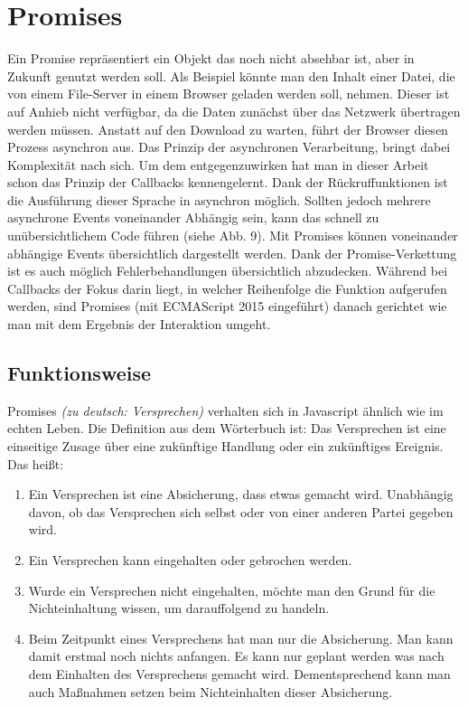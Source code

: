 \section{Promises}

Ein Promise repräsentiert ein Objekt das noch nicht absehbar ist, aber in Zukunft genutzt werden soll. Als Beispiel könnte man den Inhalt einer Datei, die von einem File-Server in einem Browser geladen werden soll, nehmen. Dieser ist auf Anhieb nicht verfügbar, da die Daten zunächst über das Netzwerk übertragen werden müssen. Anstatt auf den Download zu warten, führt der Browser diesen Prozess asynchron aus. Das Prinzip der asynchronen Verarbeitung, bringt dabei Komplexität nach sich. Um dem entgegenzuwirken hat man in dieser Arbeit schon das Prinzip der Callbacks kennengelernt. Dank der Rückruffunktionen ist die Ausführung dieser Sprache in asynchron möglich. Sollten jedoch mehrere asynchrone Events voneinander Abhängig sein, kann das schnell zu unübersichtlichem Code führen (siehe Abb. 9). Mit Promises können voneinander abhängige Events übersichtlich dargestellt werden. Dank der Promise-Verkettung ist es auch möglich Fehlerbehandlungen übersichtlich abzudecken. Während bei Callbacks der Fokus darin liegt, in welcher Reihenfolge die Funktion aufgerufen werden, sind Promises (mit ECMAScript 2015 eingeführt) danach gerichtet wie man mit dem Ergebnis der Interaktion umgeht.

\subsection{Funktionsweise}

\noindent
Promises \textit{(zu deutsch: Versprechen)} verhalten sich in Javascript ähnlich wie im echten Leben. Die Definition aus dem Wörterbuch ist: Das Versprechen ist eine einseitige Zusage über eine zukünftige Handlung oder ein zukünftiges Ereignis. \cite{versprechen} \\

\noindent
Das heißt:

\begin{enumerate}
    \item Ein Versprechen ist eine Absicherung, dass etwas gemacht wird. Unabhängig davon, ob das Versprechen sich selbst oder von einer anderen Partei gegeben wird.
    
    \item Ein Versprechen kann eingehalten oder gebrochen werden.
    
    \item Wurde ein Versprechen nicht eingehalten, möchte man den Grund für die Nichteinhaltung wissen, um darauffolgend zu handeln.
    
    \item Beim Zeitpunkt eines Versprechens hat man nur die Absicherung. Man kann damit erstmal noch nichts anfangen. Es kann nur geplant werden was nach dem Einhalten des Versprechens gemacht wird. Dementsprechend kann man auch Maßnahmen setzen beim Nichteinhalten dieser Absicherung.
    
\end{enumerate}

